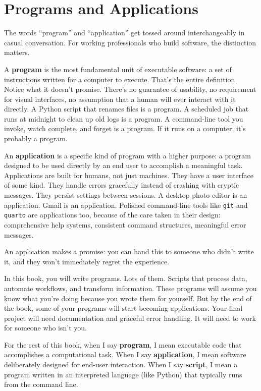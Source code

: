 \documentclass[
  letterpaper,
  DIV=11,
  numbers=noendperiod]{scrreprt}
\begin{document}
\section{Programs and Applications}\label{programs-and-applications}

The words ``program'' and ``application'' get tossed around
interchangeably in casual conversation. For working professionals who
build software, the distinction matters.

A \textbf{program} is the most fundamental unit of executable software:
a set of instructions written for a computer to execute. That's the
entire definition. Notice what it doesn't promise. There's no guarantee
of usability, no requirement for visual interfaces, no assumption that a
human will ever interact with it directly. A Python script that renames
files is a program. A scheduled job that runs at midnight to clean up
old logs is a program. A command-line tool you invoke, watch complete,
and forget is a program. If it runs on a computer, it's probably a
program.

An \textbf{application} is a specific kind of program with a higher
purpose: a program designed to be used directly by an end user to
accomplish a meaningful task. Applications are built for humans, not
just machines. They have a user interface of some kind. They handle
errors gracefully instead of crashing with cryptic messages. They
persist settings between sessions. A desktop photo editor is an
application. Gmail is an application. Polished command-line tools like
\texttt{git} and \texttt{quarto} are applications too, because of the
care taken in their design: comprehensive help systems, consistent
command structures, meaningful error messages.

An application makes a promise: you can hand this to someone who didn't
write it, and they won't immediately regret the experience.

In this book, you will write programs. Lots of them. Scripts that
process data, automate workflows, and transform information. These
programs will assume you know what you're doing because you wrote them
for yourself. But by the end of the book, some of your programs will
start becoming applications. Your final project will need documentation
and graceful error handling. It will need to work for someone who isn't
you.

For the rest of this book, when I say \textbf{program}, I mean
executable code that accomplishes a computational task. When I say
\textbf{application}, I mean software deliberately designed for end-user
interaction. When I say \textbf{script}, I mean a program written in an
interpreted language (like Python) that typically runs from the command
line.
\end{document}
